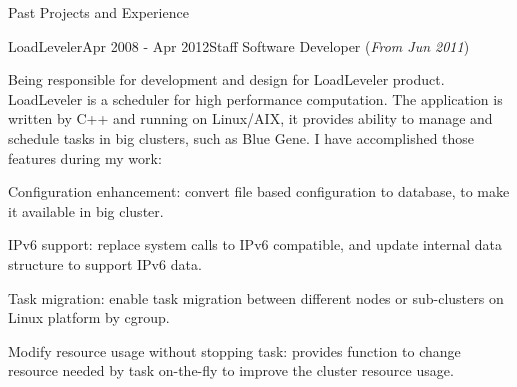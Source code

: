 \documentclass{resume} %
\newcommand{\http}{http:/\hspace{-0.3ex}/}
\begin{document}
\begin{rSection}{Past Projects and Experience}
%
%



\begin{rSubsection}{LoadLeveler}{Apr 2008 - Apr 2012}{Staff Software Developer (\textit{From Jun 2011})}{}

Being responsible for development and design for LoadLeveler product. LoadLeveler is a scheduler for high performance computation. The application is written by C++ and running on Linux/AIX, it provides ability to manage and schedule tasks in big clusters, such as Blue Gene. I have accomplished those features during my work:

\begin{rSubsectionList}
\item Configuration enhancement: convert file based configuration to database, to make it available in big cluster.
\item IPv6 support: replace system calls to IPv6 compatible, and update internal data structure to support IPv6 data.
\item Task migration: enable task migration between different nodes or sub-clusters on Linux platform by cgroup.
\item Modify resource usage without stopping task: provides function to change resource needed by task on-the-fly to improve the cluster resource usage.
\end{rSubsectionList}\vspace{-1.5em}


\end{rSubsection}
\end{rSection}
\end{document}
